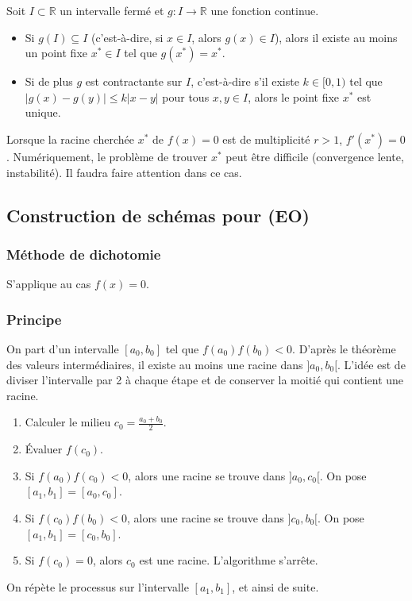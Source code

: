 \documentclass{article}
\begin{document}
\begin{proposition}[Point fixe - Cas $x=g(x)$]
Soit $I \subset \mathbb{R}$ un intervalle fermé et $g: I \to \mathbb{R}$ une fonction continue.
\begin{itemize}
    \item Si $g(I) \subseteq I$ (c'est-à-dire, si $x \in I$, alors $g(x) \in I$), alors il existe au moins un point fixe $x^* \in I$ tel que $g(x^*) = x^*$.
    \item Si de plus $g$ est contractante sur $I$, c'est-à-dire s'il existe $k \in [0, 1)$ tel que $|g(x) - g(y)| \le k |x - y|$ pour tous $x, y \in I$, alors le point fixe $x^*$ est unique.
\end{itemize}
\end{proposition}

\begin{remark}
Lorsque la racine cherchée $x^*$ de $f(x)=0$ est de multiplicité $r > 1$, $f'(x^*) = 0$. Numériquement, le problème de trouver $x^*$ peut être difficile (convergence lente, instabilité). Il faudra faire attention dans ce cas.
\end{remark}

\subsection{Construction de schémas pour (EO)} %

\subsubsection{Méthode de dichotomie} %
S'applique au cas $f(x)=0$.

\subsubsection{Principe} %
On part d'un intervalle $[a_0, b_0]$ tel que $f(a_0)f(b_0) < 0$. D'après le théorème des valeurs intermédiaires, il existe au moins une racine dans $]a_0, b_0[$.
L'idée est de diviser l'intervalle par 2 à chaque étape et de conserver la moitié qui contient une racine.
\begin{enumerate}
    \item Calculer le milieu $c_0 = \frac{a_0 + b_0}{2}$.
    \item Évaluer $f(c_0)$.
    \item Si $f(a_0)f(c_0) < 0$, alors une racine se trouve dans $]a_0, c_0[$. On pose $[a_1, b_1] = [a_0, c_0]$.
    \item Si $f(c_0)f(b_0) < 0$, alors une racine se trouve dans $]c_0, b_0[$. On pose $[a_1, b_1] = [c_0, b_0]$.
    \item Si $f(c_0) = 0$, alors $c_0$ est une racine. L'algorithme s'arrête.
\end{enumerate}
On répète le processus sur l'intervalle $[a_1, b_1]$, et ainsi de suite.
\end{document}
